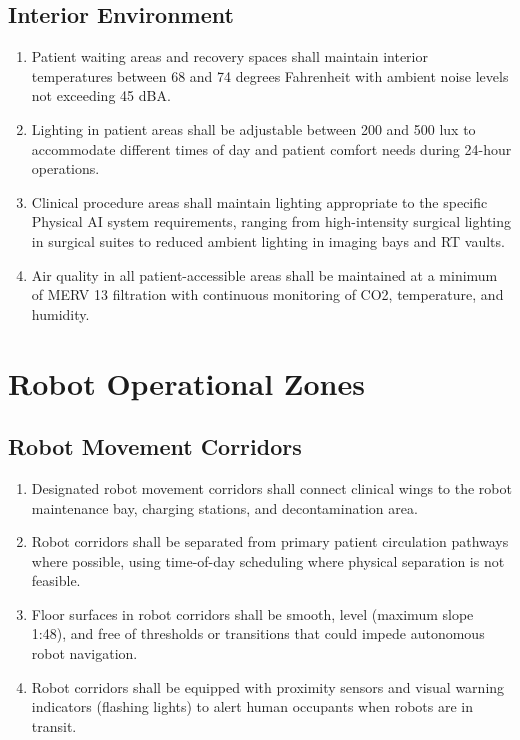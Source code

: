 \subsection{Interior Environment}

\begin{enumerate}[label=(\alph*)]
\item Patient waiting areas and recovery spaces shall maintain interior
  temperatures between 68 and 74 degrees Fahrenheit with ambient noise levels
  not exceeding 45 dBA.

\item Lighting in patient areas shall be adjustable between 200 and 500 lux to
  accommodate different times of day and patient comfort needs during 24-hour
  operations.

\item Clinical procedure areas shall maintain lighting appropriate to the
  specific Physical AI system requirements, ranging from high-intensity surgical
  lighting in surgical suites to reduced ambient lighting in imaging bays and
  RT vaults.

\item Air quality in all patient-accessible areas shall be maintained at a
  minimum of MERV 13 filtration with continuous monitoring of CO2, temperature,
  and humidity.
\end{enumerate}

\section{Robot Operational Zones}

\subsection{Robot Movement Corridors}

\begin{enumerate}[label=(\alph*)]
\item Designated robot movement corridors shall connect clinical wings to the
  robot maintenance bay, charging stations, and decontamination area.

\item Robot corridors shall be separated from primary patient circulation
  pathways where possible, using time-of-day scheduling where physical
  separation is not feasible.

\item Floor surfaces in robot corridors shall be smooth, level (maximum slope
  1:48), and free of thresholds or transitions that could impede autonomous
  robot navigation.

\item Robot corridors shall be equipped with proximity sensors and visual
  warning indicators (flashing lights) to alert human occupants when robots
  are in transit.
\end{enumerate}

